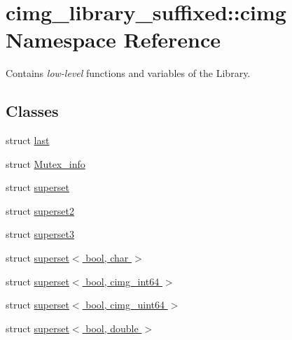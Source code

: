 \hypertarget{namespacecimg__library__suffixed_1_1cimg}{}\section{cimg\+\_\+library\+\_\+suffixed\+:\+:cimg Namespace Reference}
\label{namespacecimg__library__suffixed_1_1cimg}


Contains {\itshape low-\/level} functions and variables of the  Library.  


\subsection*{Classes}
\begin{DoxyCompactItemize}
\item 
struct \hyperlink{namespacecimg__library__suffixed_1_1cimg_d7/d43/structcimg__library__suffixed_1_1cimg_1_1last}{last}
\item 
struct \hyperlink{structcimg__library__suffixed_1_1cimg_1_1Mutex__info}{Mutex\+\_\+info}
\item 
struct \hyperlink{namespacecimg__library__suffixed_1_1cimg_d5/d9e/structcimg__library__suffixed_1_1cimg_1_1superset}{superset}
\item 
struct \hyperlink{namespacecimg__library__suffixed_1_1cimg_d3/d82/structcimg__library__suffixed_1_1cimg_1_1superset2}{superset2}
\item 
struct \hyperlink{namespacecimg__library__suffixed_1_1cimg_dd/d5d/structcimg__library__suffixed_1_1cimg_1_1superset3}{superset3}
\item 
struct \hyperlink{namespacecimg__library__suffixed_1_1cimg_d4/d31/structcimg__library__suffixed_1_1cimg_1_1superset_3_01bool_00_01char_01_4}{superset$<$ bool, char $>$}
\item 
struct \hyperlink{namespacecimg__library__suffixed_1_1cimg_da/d66/structcimg__library__suffixed_1_1cimg_1_1superset_3_01bool_00_01cimg__int64_01_4}{superset$<$ bool, cimg\+\_\+int64 $>$}
\item 
struct \hyperlink{namespacecimg__library__suffixed_1_1cimg_d0/d12/structcimg__library__suffixed_1_1cimg_1_1superset_3_01bool_00_01cimg__uint64_01_4}{superset$<$ bool, cimg\+\_\+uint64 $>$}
\item 
struct \hyperlink{namespacecimg__library__suffixed_1_1cimg_da/d5e/structcimg__library__suffixed_1_1cimg_1_1superset_3_01bool_00_01double_01_4}{superset$<$ bool, double $>$}
\item 

\end{DoxyCompactItemize}
